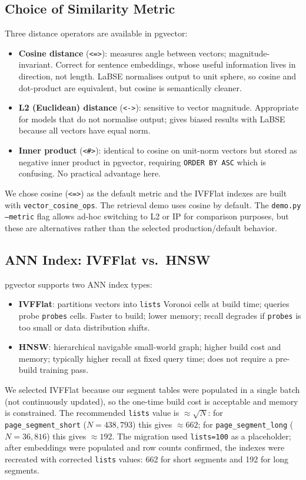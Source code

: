 \documentclass[9pt]{IEEEtran}
\begin{document}
\subsection{Choice of Similarity Metric}
Three distance operators are available in pgvector:
\begin{itemize}
    \item \textbf{Cosine distance} (\texttt{<=>}): measures angle between vectors; magnitude-invariant.
    Correct for sentence embeddings, whose useful information lives in direction, not length. LaBSE normalises output to unit sphere, so cosine and dot-product are equivalent, but cosine is semantically cleaner.
    \item \textbf{L2 (Euclidean) distance} (\texttt{<->}): sensitive to vector magnitude. Appropriate for models that do not normalise output; gives biased results with LaBSE because all vectors have equal norm.
    \item \textbf{Inner product} (\texttt{<\#>}): identical to cosine on unit-norm vectors but stored as negative inner product in pgvector, requiring \texttt{ORDER BY ASC} which is confusing. No practical advantage here.
\end{itemize}
We chose cosine (\texttt{<=>}) as the default metric and the IVFFlat indexes are built with \texttt{vector\_cosine\_ops}.
The retrieval demo uses cosine by default. The \texttt{demo.py} \texttt{--metric} flag allows ad-hoc switching to L2 or IP for comparison purposes, but these are alternatives rather than the selected production/default behavior.

\subsection{ANN Index: IVFFlat vs.\ HNSW}
pgvector supports two ANN index types:
\begin{itemize}
    \item \textbf{IVFFlat}: partitions vectors into \texttt{lists} Voronoi cells at build time; queries probe \texttt{probes} cells. Faster to build; lower memory; recall degrades if \texttt{probes} is too small or data distribution shifts.
    \item \textbf{HNSW}: hierarchical navigable small-world graph; higher build cost and memory; typically higher recall at fixed query time; does not require a pre-build training pass.
\end{itemize}
We selected IVFFlat because our segment tables were populated in a single batch (not continuously updated), so the one-time build cost is acceptable and memory is constrained.
The recommended \texttt{lists} value is $\approx\sqrt{N}$: for \texttt{page\_segment\_short} ($N=438{,}793$) this gives $\approx 662$; for \texttt{page\_segment\_long} ($N=36{,}816$) this gives $\approx 192$.
The migration used \texttt{lists=100} as a placeholder; after embeddings were populated and row counts confirmed, the indexes were recreated with corrected \texttt{lists} values: 662 for short segments and 192 for long segments.
\end{document}
